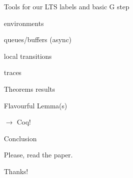 \documentclass[xcolor={dvipsnames}]{beamer}
\begin{document}
\begin{frame}{Tools for our LTS}
  labels and basic G step

  environments

  queues/buffers (async)

  local transitions

  traces
\end{frame}


\begin{frame}{Theorems}
results

\end{frame}

\begin{frame}{Flavourful Lemma(s)}

$\longrightarrow$ Coq!

\end{frame}

\begin{frame}{Conclusion}

  Please, read the paper.


Thanks!

\end{frame}
\end{document}
